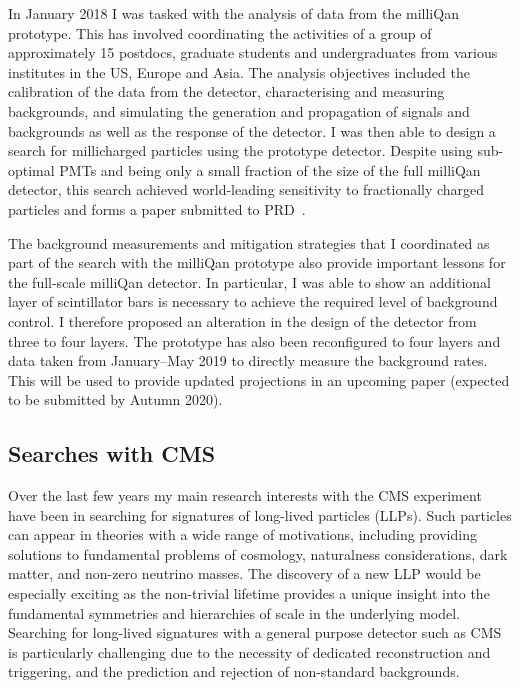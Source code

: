 \documentclass[11pt]{article}
\theoremstyle{plain} \numberwithin{equation}{section}
\theoremstyle{definition}
\begin{document}
In January 2018 I was tasked with the analysis of data from the 
milliQan prototype. This has involved coordinating the activities of a group of approximately
15 postdocs, graduate students and undergraduates from various institutes in the US, Europe and Asia. 
The analysis objectives included the calibration of the data from the detector,
characterising and measuring backgrounds, and simulating the generation and propagation of 
signals and backgrounds as well as the response of the detector. I was then able to design
a search for millicharged particles using the prototype detector. Despite using sub-optimal PMTs 
and being only a small fraction of the size of the full milliQan detector,
this search achieved world-leading sensitivity to fractionally charged particles and forms
a paper submitted to PRD~\cite{ball2020search}.

The background measurements and mitigation strategies that I coordinated
as part of the search with the milliQan prototype also provide important
lessons for the full-scale milliQan detector. In particular, I was able to show 
an additional layer of scintillator bars is necessary to achieve the required
level of background control. I therefore proposed an alteration 
in the design of the detector from three to four layers. The prototype has also 
been reconfigured to four layers and data taken from January--May 2019 to 
directly measure the background rates. This will be used to provide updated
projections in an upcoming paper (expected to be submitted by Autumn 2020).

\subsection*{Searches with CMS}

Over the last few years my main research interests with the CMS experiment
have been in searching for signatures of long-lived particles (LLPs). 
Such particles can appear in theories with a wide range of motivations, 
including providing solutions to fundamental problems of cosmology, naturalness considerations,
dark matter, and non-zero neutrino masses. The discovery
of a new LLP would be especially exciting as the non-trivial lifetime
provides a unique insight into the fundamental symmetries and hierarchies of scale in the underlying model.
Searching for long-lived signatures with a general purpose detector such as CMS is particularly 
challenging due to the necessity of dedicated reconstruction and triggering, and
the prediction and rejection of non-standard backgrounds. 
\end{document}
